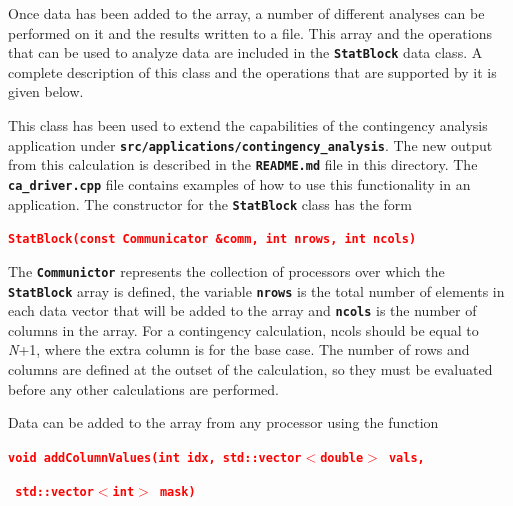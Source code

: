 \documentclass[12pt]{report} %
\begin{document}


Once data has been added to the array, a number of different analyses can be performed on it and the results written to a file. This array and the operations that can be used to analyze data are included in the \texttt{\textbf{StatBlock}} data class. A complete description of this class and the operations that are supported by it is given below.

This class has been used to extend the capabilities of the contingency analysis application under \texttt{\textbf{src/applications/contingency\_analysis}}. The new output from this calculation is described in the \texttt{\textbf{README.md}} file in this directory. The \texttt{\textbf{ca\_driver.cpp}} file contains examples of how to use this functionality in an application.
The constructor for the \texttt{\textbf{StatBlock}} class has the form

\textcolor{red}{\texttt{\textbf{StatBlock(const Communicator \&comm, int nrows, int ncols)}}}

The \texttt{\textbf{Communictor}} represents the collection of processors over which the \texttt{\textbf{StatBlock}} array is defined, the variable \texttt{\textbf{nrows}} is the total number of elements in each data vector that will be added to the array and \texttt{\textbf{ncols}} is the number of columns in the array. For a contingency calculation, ncols should be equal to \textit{N}+1, where the extra column is for the base case. The number of rows and columns are defined at the outset of the calculation, so they must be evaluated before any other calculations are performed.

Data can be added to the array from any processor using the function

\textcolor{red}{\texttt{\textbf{void addColumnValues(int idx, std::vector$\boldsymbol{\mathrm{<}}$double$\boldsymbol{\mathrm{>}}$ vals,}}}

\textcolor{red}{\texttt{\textbf{                     std::vector$\boldsymbol{\mathrm{<}}$int$\boldsymbol{\mathrm{>}}$ mask)}}}
\end{document}
